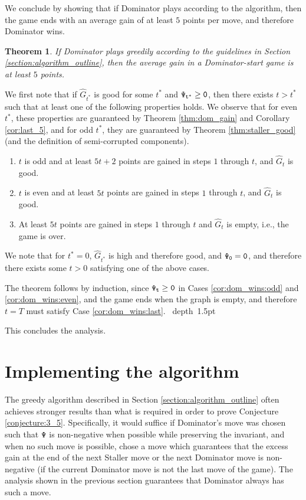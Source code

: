 \documentclass[11pt]{article}
\def\Proof{\par\noindent{\bf Proof:~}}
\def\blackslug{\hbox{\hskip 1pt \vrule width 4pt height 8pt
    depth 1.5pt \hskip 1pt}}
\def\QED{\quad\blackslug\lower 8.5pt\null\par}
\def\dnsitem{\vspace{-7pt}\item}
\newtheorem{theorem}{Theorem}[section]
\theoremstyle{definition}
\def\varexcess{\tt \Psi}
\begin{document}
We conclude by showing that if Dominator plays according to the algorithm, then the game ends with an average gain of at least $5$ points per move, and therefore Dominator wins.

\begin{theorem}
\label{cor:dom_wins}
If Dominator plays greedily according to the guidelines in Section \ref{section:algorithm_outline}, then the average gain in a Dominator-start game is at least $5$ points.
\end{theorem}
\Proof
We first note that if $\hat{G}_{t^*}$ is good for some $t^*$ and $\varexcess_{t^*} \geq 0$, then there exists $t > t^*$ such that at least one of the following properties holds.
We observe that for even $t^*$, these properties are guaranteed by Theorem \ref{thm:dom_gain} and Corollary \ref{cor:last_5},
and for odd $t^*$, they are guaranteed by Theorem \ref{thm:staller_good} (and the definition of semi-corrupted components).

\begin{enumerate}
	\dnsitem \label{cor:dom_wins:odd}
	$t$ is odd and at least $5 t + 2$ points are gained in steps $1$ through $t$, and $\hat{G}_t$ is good.
	
	\dnsitem \label{cor:dom_wins:even}
	$t$ is even and at least $5 t$ points are gained in steps $1$ through $t$, and $\hat{G}_t$ is good.
	
	\dnsitem \label{cor:dom_wins:last}
	At least $5 t$ points are gained in steps $1$ through $t$ and $\hat{G}_t$ is empty, i.e., the game is over.
\end{enumerate}

We note that for $t^* = 0$, $\hat{G}_{t^*}$ is high and therefore good,
and $\varexcess_0 = 0$, and therefore there exists some $t > 0$ satisfying one of the above cases.

The theorem follows by induction, since $\varexcess_t \geq 0$ in Cases \ref{cor:dom_wins:odd} and \ref{cor:dom_wins:even}, and the game ends when the graph is empty, and therefore $t = T$ must satisfy Case \ref{cor:dom_wins:last}.
\QED

This concludes the analysis.

\section{Implementing the algorithm}
\label{section:implementation}

The greedy algorithm described in Section \ref{section:algorithm_outline} often achieves stronger results than what is required in order to prove Conjecture \ref{conjecture:3_5}.
Specifically, it would suffice if Dominator's move was chosen such that $\varexcess$ is non-negative when possible while preserving the invariant, 
and when no such move is possible, chose a move which guarantees that the excess gain at the end of the next Staller move or the next Dominator move is non-negative (if the current Dominator move is not the last move of the game).
The analysis shown in the previous section guarantees that Dominator always has such a move.
\end{document}

